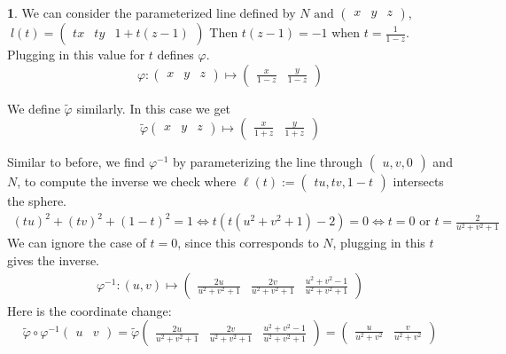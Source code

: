 \documentclass[10.5pt]{article}
\theoremstyle{definition}
\newtheorem{pb}{}
\newcommand{\tand}{\text{ and }}
\newcommand{\tor}{\text{ or }}
\begin{document}
\begin{pb}
    We can consider the parameterized line defined by \(N \tand \begin{pmatrix}
        x&y&z
    \end{pmatrix}\), \( \; l(t) = \begin{pmatrix}
        tx&ty&1 + t(z-1)
    \end{pmatrix}\) Then \(t(z-1) = -1\) when \(t = \frac{1}{1-z}\). Plugging in this value for \(t\) defines \(\varphi\).
    \[\varphi: \begin{pmatrix}
        x&y&z
    \end{pmatrix} \mapsto \begin{pmatrix}
        \frac{x}{1-z}& \frac{y}{1-z}
    \end{pmatrix}\]

    We define \(\tilde{\varphi}\) similarly. In this case we get
    \[\tilde{\varphi} \begin{pmatrix}
        x&y&z
    \end{pmatrix} \mapsto \begin{pmatrix}
        \frac{x}{1+z}& \frac{y}{1+z}
    \end{pmatrix}\]

    Similar to before, we find \(\varphi^{-1}\) by parameterizing the line through \(\begin{pmatrix}
        u,v,0
    \end{pmatrix}\) and \(N\), to compute the inverse we check where \(\ell(t):= \begin{pmatrix} tu, tv, 1 - t\end{pmatrix}\) intersects the sphere.
    \begin{align*}
        (tu)^2 + (tv)^2 + (1-t)^2 = 1 \iff t(t(u^2 + v^2 + 1) - 2) = 0 \iff t = 0 \tor t = \frac{2}{u^2 + v^2 + 1}
    \end{align*}
    We can ignore the case of \(t=0\), since this corresponds to \(N\), plugging in this \(t\) gives the inverse.
    \begin{align*}
        \varphi^{-1}: (u,v) \mapsto \begin{pmatrix}
            \frac{2u}{u^2+v^2+1}&\frac{2v}{u^2+v^2+1}&\frac{u^2+v^2-1}{u^2+v^2+1}
        \end{pmatrix}
    \end{align*}
    Here is the coordinate change:
    \[\tilde{\varphi}\circ \varphi^{-1}\begin{pmatrix}
        u&v
    \end{pmatrix} = \tilde{\varphi}\begin{pmatrix}
        \frac{2u}{u^2+v^2+1}&\frac{2v}{u^2+v^2+1}&\frac{u^2+v^2-1}{u^2+v^2+1}
    \end{pmatrix} = \begin{pmatrix}
       \frac{u}{u^2+v^2}&\frac{v}{u^2+v^2}
    \end{pmatrix}\]
\end{pb}
\end{document}
